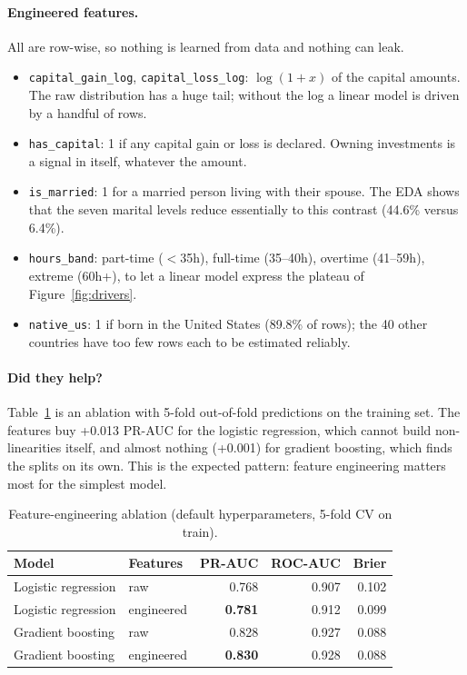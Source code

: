 \documentclass[11pt,a4paper]{article}
\newcommand{\code}[1]{\texttt{#1}}
\begin{document}
\paragraph{Engineered features.} All are row-wise, so nothing is learned from data and nothing can leak.
\begin{itemize}
\item \code{capital\_gain\_log}, \code{capital\_loss\_log}: $\log(1+x)$ of the capital amounts. The raw
distribution has a huge tail; without the log a linear model is driven by a handful of rows.
\item \code{has\_capital}: 1 if any capital gain or loss is declared. Owning investments is a signal
in itself, whatever the amount.
\item \code{is\_married}: 1 for a married person living with their spouse. The EDA shows that the
seven marital levels reduce essentially to this contrast (44.6\% versus 6.4\%).
\item \code{hours\_band}: part-time ($<$35h), full-time (35--40h), overtime (41--59h), extreme (60h+),
to let a linear model express the plateau of Figure~\ref{fig:drivers}.
\item \code{native\_us}: 1 if born in the United States (89.8\% of rows); the 40 other countries have
too few rows each to be estimated reliably.
\end{itemize}

\paragraph{Did they help?} Table~\ref{tab:fe} is an ablation with 5-fold out-of-fold predictions on the
training set. The features buy +0.013 PR-AUC for the logistic regression, which cannot build
non-linearities itself, and almost nothing (+0.001) for gradient boosting, which finds the splits
on its own. This is the expected pattern: feature engineering matters most for the simplest model.

\begin{table}[H]\centering\small
\begin{tabular}{llrrr}\toprule
Model & Features & PR-AUC & ROC-AUC & Brier\\\midrule
Logistic regression & raw & 0.768 & 0.907 & 0.102\\
Logistic regression & engineered & \textbf{0.781} & 0.912 & 0.099\\
Gradient boosting & raw & 0.828 & 0.927 & 0.088\\
Gradient boosting & engineered & \textbf{0.830} & 0.928 & 0.088\\\bottomrule
\end{tabular}
\caption{Feature-engineering ablation (default hyperparameters, 5-fold CV on train).}\label{tab:fe}
\end{table}
\end{document}
